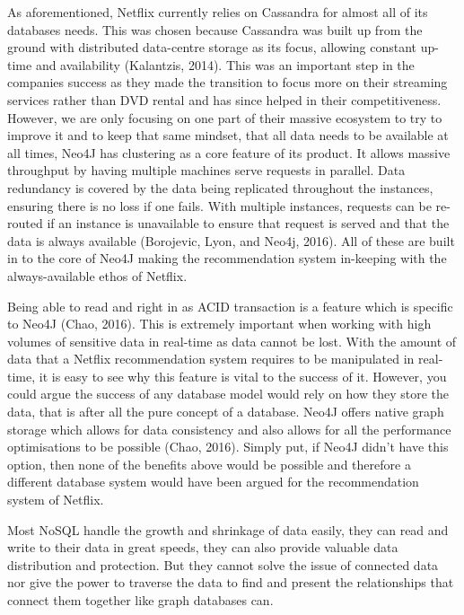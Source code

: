 \documentclass[a4paper]{article}
\begin{document}
As aforementioned, Netflix currently relies on Cassandra for almost all of its databases needs. This was chosen because Cassandra was built up from the ground with distributed data-centre storage as its focus, allowing constant up-time and availability (Kalantzis, 2014). This was an important step in the companies success as they made the transition to focus more on their streaming services rather than DVD rental and has since helped in their competitiveness. However, we are only focusing on one part of their massive ecosystem to try to improve it and to keep that same mindset, that all data needs to be available at all times, Neo4J has clustering as a core feature of its product. It allows massive throughput by having multiple machines serve requests in parallel. Data redundancy is covered by the data being replicated throughout the instances, ensuring there is no loss if one fails. With multiple instances, requests can be re-routed if an instance is unavailable to ensure that request is served and that the data is always available (Borojevic, Lyon, and Neo4j, 2016). All of these are built in to the core of Neo4J making the recommendation system in-keeping with the always-available ethos of Netflix. \par

Being able to read and right in as ACID transaction is a feature which is specific to Neo4J (Chao, 2016). This is extremely important when working with high volumes of sensitive data in real-time as data cannot be lost. With the amount of data that a Netflix recommendation system requires to be manipulated in real-time, it is easy to see why this feature is vital to the success of it. However, you could argue the success of any database model would rely on how they store the data, that is after all the pure concept of a database. Neo4J offers native graph storage which allows for data consistency and also allows for all the performance optimisations to be possible (Chao, 2016). Simply put, if Neo4J didn't have this option, then none of the benefits above would be possible and therefore a different database system would have been argued for the recommendation system of Netflix.

Most NoSQL handle the growth and shrinkage of data easily, they can read and write to their data in great speeds, they can also provide valuable data distribution and protection. But they cannot solve the issue of connected data nor give the power to traverse the data to find and present the relationships that connect them together like graph databases can. \par
\end{document}
